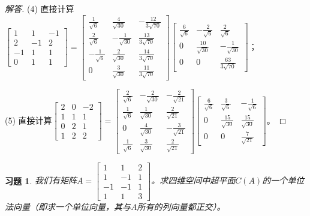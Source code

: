 \documentclass[UTF8]{ctexart}
\newtheorem{ex}[thm]{习题}
\begin{document}
\begin{proof}[解答]
(4) 直接计算$\begin{bmatrix}1&1&-1\\2&-1&2\\-1&1&1\\0&1&1\end{bmatrix}=\begin{bmatrix}\frac{1}{\sqrt{6}}&\frac{4}{\sqrt{30}}&-\frac{12}{3\sqrt{70}}\\\frac{2}{\sqrt{6}}&-\frac{1}{\sqrt{30}}&\frac{13}{3\sqrt{70}}\\-\frac{1}{\sqrt{6}}&\frac{2}{\sqrt{30}}&\frac{14}{3\sqrt{70}}\\0&\frac{3}{\sqrt{30}}&\frac{11}{3\sqrt{70}}\end{bmatrix}\begin{bmatrix}\frac{6}{\sqrt{6}}&-\frac{2}{\sqrt{6}}&\frac{2}{\sqrt{6}}\\0&\frac{10}{\sqrt{30}}&-\frac{1}{\sqrt{30}}\\0&0&\frac{63}{3\sqrt{70}}\end{bmatrix}$；

(5) 直接计算$\begin{bmatrix}2&0&-2\\1&1&1\\0&2&1\\1&2&2\end{bmatrix}=\begin{bmatrix}\frac{2}{\sqrt{6}}&-\frac{2}{\sqrt{30}}&-\frac{2}{\sqrt{21}}\\\frac{1}{\sqrt{6}}&\frac{1}{\sqrt{30}}&\frac{2}{\sqrt{21}}\\0&\frac{4}{\sqrt{30}}&-\frac{3}{\sqrt{21}}\\\frac{1}{\sqrt{6}}&\frac{3}{\sqrt{30}}&\frac{2}{\sqrt{21}}\end{bmatrix}\begin{bmatrix}\frac{6}{\sqrt{6}}&\frac{3}{\sqrt{6}}&-\frac{1}{\sqrt{6}}\\0&\frac{15}{\sqrt{30}}&\frac{15}{\sqrt{30}}\\0&0&\frac{7}{\sqrt{21}}\end{bmatrix}$。
\end{proof}




\begin{ex}
我们有矩阵$A=\begin{bmatrix}1&1&2\\1&-1&1\\-1&-1&1\\1&1&3\end{bmatrix}$。求四维空间中超平面$C(A)$的一个单位法向量（即求一个单位向量，其与$A$所有的列向量都正交）。
\end{ex}
\end{document}
